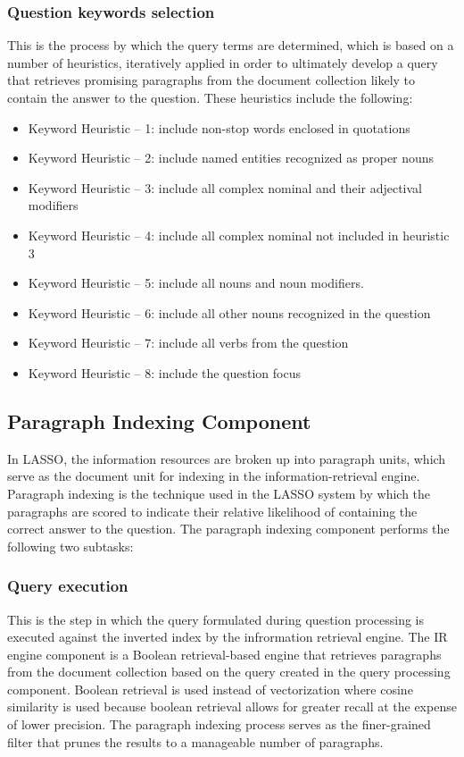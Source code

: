 \subsubsection{Question keywords selection}

This is the process by which the query terms are determined, which is based on a number of heuristics, iteratively applied in order to ultimately develop a query that retrieves promising paragraphs from the document collection likely to contain the answer to the question.  These heuristics include the following:

\begin{itemize}
\item Keyword Heuristic – 1: include non-stop words enclosed in quotations 
\item Keyword Heuristic – 2: include named entities recognized as proper nouns 
\item Keyword Heuristic – 3: include all complex nominal and their adjectival modifiers
\item Keyword Heuristic – 4: include all complex nominal not included in heuristic 3 
\item Keyword Heuristic – 5: include all nouns and noun modifiers.
\item Keyword Heuristic – 6: include all other nouns recognized in the question 
\item Keyword Heuristic – 7: include all verbs from the question
\item Keyword Heuristic – 8: include the question focus 
\end{itemize}

\subsection{Paragraph Indexing Component}

In LASSO, the information resources are broken up into paragraph units, which serve as the document unit for indexing in the information-retrieval engine.  Paragraph indexing is the technique used in the LASSO system by which the paragraphs are scored to indicate their relative likelihood of containing the correct answer to the question.  The paragraph indexing component performs the following two subtasks:

\subsubsection{Query execution}

This is the step in which the query formulated during question processing is executed against the inverted index by the infrormation retrieval engine.  The IR engine component is a Boolean retrieval-based engine that retrieves paragraphs from the document collection based on the query created in the query processing component.  Boolean retrieval is used instead of vectorization where cosine similarity is used because boolean retrieval allows for greater recall at the expense of lower precision.  The paragraph indexing process serves as the finer-grained filter that prunes the results to a manageable number of paragraphs.

